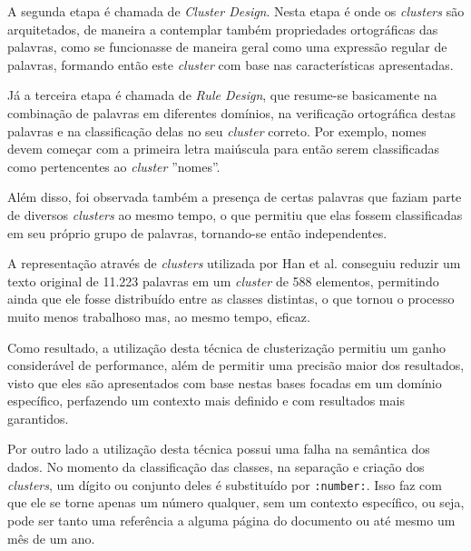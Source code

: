 A segunda etapa é chamada de \textit{Cluster Design}. Nesta etapa é onde os \textit{clusters} são arquitetados, de maneira a contemplar também propriedades ortográficas das palavras, como se funcionasse de maneira geral como uma expressão regular de palavras, formando então este \textit{cluster} com base nas características apresentadas.

\begin{textoalterado}
Já a terceira etapa é chamada de \textit{Rule Design}, que resume-se basicamente na  combinação de palavras em diferentes domínios, na verificação ortográfica destas palavras e na classificação delas no seu \textit{cluster} correto. Por exemplo, nomes devem começar com a primeira letra maiúscula para então serem classificadas como pertencentes ao \textit{cluster} ''nomes''.
\end{textoalterado}

\begin{textonovo}
Além disso, foi observada também a presença de certas palavras que faziam parte de diversos \textit{clusters} ao mesmo tempo, o que permitiu que elas fossem classificadas em seu próprio grupo de palavras, tornando-se então independentes.
\end{textonovo}

\begin{textonovo}
A representação através de \textit{clusters} utilizada por Han et al. \cite{Han-Giles-WC} conseguiu reduzir um texto original de 11.223 palavras em um \textit{cluster} de 588 elementos, permitindo ainda que ele fosse distribuído entre as classes distintas, o que tornou o processo muito menos trabalhoso mas, ao mesmo tempo, eficaz.
\end{textonovo}

\begin{textoalterado}
Como resultado, a utilização desta técnica de clusterização permitiu um ganho considerável de performance, além de permitir uma precisão maior dos resultados, visto que eles são apresentados com base nestas bases focadas em um domínio específico, perfazendo um contexto mais definido e com resultados mais garantidos.

Por outro lado a utilização desta técnica possui uma falha na semântica dos dados. No momento da classificação das classes, na separação e criação dos \textit{clusters}, um dígito ou conjunto deles é substituído por \texttt{:number:}. Isso faz com que ele se torne apenas um número qualquer, sem um contexto específico, ou seja, pode ser tanto uma referência a alguma página do documento ou até mesmo um mês de um ano.

\end{textoalterado}



